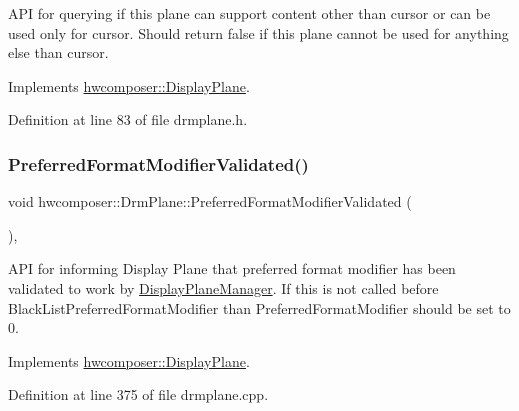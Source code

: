 A\+PI for querying if this plane can support content other than cursor or can be used only for cursor. Should return false if this plane cannot be used for anything else than cursor. 

Implements \mbox{\hyperlink{classhwcomposer_1_1DisplayPlane_a7b374ba9e799f7d0b53afbd939961c51}{hwcomposer\+::\+Display\+Plane}}.



Definition at line 83 of file drmplane.\+h.


\begin{DoxyCode}{0}
\end{DoxyCode}
\mbox{\label{classhwcomposer_1_1DrmPlane_a476d9d42a81eddb775bb285cc1c68cfb}} 
\subsubsection{\texorpdfstring{Preferred\+Format\+Modifier\+Validated()}{PreferredFormatModifierValidated()}}
{\footnotesize\ttfamily void hwcomposer\+::\+Drm\+Plane\+::\+Preferred\+Format\+Modifier\+Validated (\begin{DoxyParamCaption}{ }\end{DoxyParamCaption})\hspace{0.3cm}{\ttfamily [override]}, {\ttfamily [virtual]}}

A\+PI for informing Display Plane that preferred format modifier has been validated to work by \mbox{\hyperlink{classhwcomposer_1_1DisplayPlaneManager}{Display\+Plane\+Manager}}. If this is not called before Black\+List\+Preferred\+Format\+Modifier than Preferred\+Format\+Modifier should be set to 0. 

Implements \mbox{\hyperlink{classhwcomposer_1_1DisplayPlane_a8d2d4175bec7646f1f4216d3488bb2f6}{hwcomposer\+::\+Display\+Plane}}.



Definition at line 375 of file drmplane.\+cpp.


\begin{DoxyCode}{0}
\end{DoxyCode}
\mbox{\label{classhwcomposer_1_1DrmPlane_a17dbc59adab79a264b50e8727a6ad281}} 
